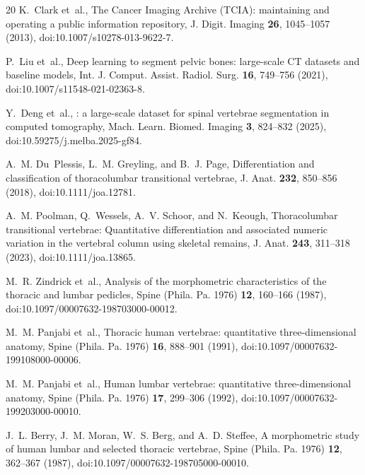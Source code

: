 \documentclass[aapm,mph,amsmath,amssymb,preprint,linenumbers]{revtex4-2}
\begin{document}
\begin{thebibliography}{20}
K.~Clark et~al.,
\newblock The {Cancer Imaging Archive} ({TCIA}): maintaining and operating a public information repository,
\newblock J. Digit. Imaging {\bf 26}, 1045--1057 (2013),
\newblock doi:10.1007/s10278-013-9622-7.

P.~Liu et~al.,
\newblock Deep learning to segment pelvic bones: large-scale {CT} datasets and baseline models,
\newblock Int. J. Comput. Assist. Radiol. Surg. {\bf 16}, 749--756 (2021),
\newblock doi:10.1007/s11548-021-02363-8.

Y.~Deng et~al.,
: a large-scale dataset for spinal vertebrae segmentation in computed tomography,
\newblock Mach. Learn. Biomed. Imaging {\bf 3}, 824--832 (2025),
\newblock doi:10.59275/j.melba.2025-gf84.

A.~M. Du~Plessis, L.~M. Greyling, and B.~J. Page,
\newblock Differentiation and classification of thoracolumbar transitional vertebrae,
\newblock J. Anat. {\bf 232}, 850--856 (2018),
\newblock doi:10.1111/joa.12781.

A.~M. Poolman, Q.~Wessels, A.~V. Schoor, and N.~Keough,
\newblock Thoracolumbar transitional vertebrae: Quantitative differentiation and associated numeric variation in the vertebral column using skeletal remains,
\newblock J. Anat. {\bf 243}, 311--318 (2023),
\newblock doi:10.1111/joa.13865.

M.~R. Zindrick et~al.,
\newblock Analysis of the morphometric characteristics of the thoracic and lumbar pedicles,
\newblock Spine (Phila. Pa. 1976) {\bf 12}, 160--166 (1987),
\newblock doi:10.1097/00007632-198703000-00012.

M.~M. Panjabi et~al.,
\newblock Thoracic human vertebrae: quantitative three-dimensional anatomy,
\newblock Spine (Phila. Pa. 1976) {\bf 16}, 888--901 (1991),
\newblock doi:10.1097/00007632-199108000-00006.

M.~M. Panjabi et~al.,
\newblock Human lumbar vertebrae: quantitative three-dimensional anatomy,
\newblock Spine (Phila. Pa. 1976) {\bf 17}, 299--306 (1992),
\newblock doi:10.1097/00007632-199203000-00010.

J.~L. Berry, J.~M. Moran, W.~S. Berg, and A.~D. Steffee,
\newblock A morphometric study of human lumbar and selected thoracic vertebrae,
\newblock Spine (Phila. Pa. 1976) {\bf 12}, 362--367 (1987),
\newblock doi:10.1097/00007632-198705000-00010.


\end{thebibliography}
\end{document}
